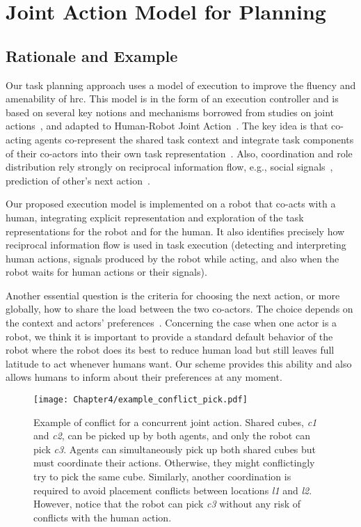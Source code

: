 \section{Joint Action Model for Planning}

    \subsection{Rationale and Example}



Our task planning approach uses a model of execution to improve the fluency and amenability of \acrshort{hrc}. 
This model is in the form of an execution controller and is based on several key notions and mechanisms borrowed from studies on joint actions~\cite{Sebanz_2016,kourtis2014attention}, and adapted to Human-Robot Joint Action~\cite{clodic-2017,curioni-2019}.
The key idea is that co-acting agents co-represent the shared task context and integrate task components of their co-actors into their own task representation~\cite{Schmitz-2017, Yamaguchi-19}. Also, coordination and role distribution rely strongly on reciprocal information flow, e.g., social signals~\cite{curioni-2019}, prediction of other's next action~\cite{luke-2018}.

Our proposed execution model is implemented on a robot that co-acts with a human, integrating explicit representation and exploration of the task representations for the robot and for the human. 
It also identifies precisely how reciprocal information flow is used in task execution (detecting and interpreting human actions, signals produced by the robot while acting, and also when the robot waits for human actions or their signals).

Another essential question is the criteria for choosing the next action, or more globally, how to share the load between the two co-actors. The choice depends on the context and actors' preferences~\cite{Gombolay-2015, Strachan-2020, Curioni-2022}. 
Concerning the case when one actor is a robot, we think it is important to provide a standard default behavior of the robot where the robot does its best to reduce human load but still leaves full latitude to act whenever humans want. 
Our scheme provides this ability and also allows humans to inform about their preferences at any moment.

\begin{figure}
    \center
    \texttt{[image: Chapter4/example\_conflict\_pick.pdf]}
    \caption{Example of conflict for a concurrent joint action. 
    Shared cubes, \emph{c1} and \emph{c2}, can be picked up by both agents, and only the robot can pick \emph{c3}. 
    Agents can simultaneously pick up both shared cubes but must coordinate their actions. Otherwise, they might conflictingly try to pick the same cube. 
    Similarly, another coordination is required to avoid placement conflicts between locations \emph{l1} and \emph{l2}.
    However, notice that the robot can pick \emph{c3} without any risk of conflicts with the human action.}
    \label{fig:conflict_pick}
\end{figure}

